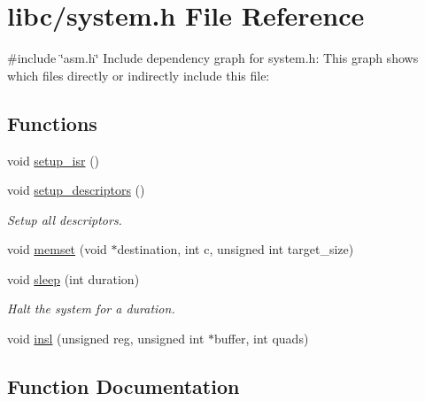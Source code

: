 \hypertarget{a00032}{}\section{libc/system.h File Reference}
\label{a00032}
{\ttfamily \#include \char`\"{}asm.\+h\char`\"{}}\newline
Include dependency graph for system.\+h\+:
This graph shows which files directly or indirectly include this file\+:
\subsection*{Functions}
\begin{DoxyCompactItemize}
\item 
void \hyperlink{a00032_a4971467ce19d8fc5727191e1b7fe16b4_a4971467ce19d8fc5727191e1b7fe16b4}{setup\+\_\+isr} ()
\item 
void \hyperlink{a00032_a8deca218d19174936135d90f3c817c04_a8deca218d19174936135d90f3c817c04}{setup\+\_\+descriptors} ()
\begin{DoxyCompactList}\small\item\em Setup all descriptors. \end{DoxyCompactList}\item 
void \hyperlink{a00032_a118c1a380204d08f9bf9ab79d650b173_a118c1a380204d08f9bf9ab79d650b173}{memset} (void $\ast$destination, int c, unsigned int target\+\_\+size)
\item 
void \hyperlink{a00032_afcc76b3d055f3137e37a9c1ce82d0b95_afcc76b3d055f3137e37a9c1ce82d0b95}{sleep} (int duration)
\begin{DoxyCompactList}\small\item\em Halt the system for a duration. \end{DoxyCompactList}\item 
void \hyperlink{a00032_a931786b5b11e1d64f4e03da6ce0c2b49_a931786b5b11e1d64f4e03da6ce0c2b49}{insl} (unsigned reg, unsigned int $\ast$buffer, int quads)
\end{DoxyCompactItemize}


\subsection{Function Documentation}
\mbox{\label{a00032_a931786b5b11e1d64f4e03da6ce0c2b49_a931786b5b11e1d64f4e03da6ce0c2b49}} 
